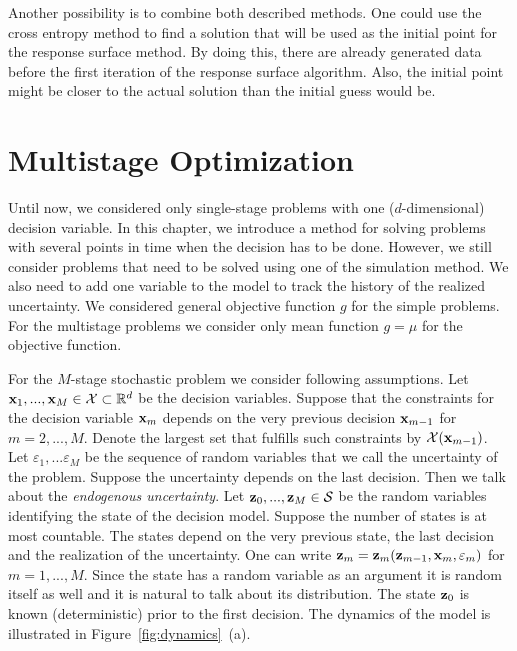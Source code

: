 Another possibility is to combine both described methods. One could use the cross entropy method to find a solution that will be used as the initial point for the response surface method. By doing this, there are already generated data before the first iteration of the response surface algorithm. Also, the initial point might be closer to the actual solution than the initial guess would be.



\section{Multistage Optimization}
	\label{chap:multistage}

Until now, we considered only single-stage problems with one ($d$-dimensional) decision variable. In this chapter, we introduce a method for solving problems with several points in time when the decision has to be done. However, we still consider problems that need to be solved using one of the simulation method. We also need to add one variable to the model to track the history of the realized uncertainty. We considered general objective function $g$ for the simple problems. For the multistage problems we consider only mean function $g = \mu$ for the objective function.

For the $M$-stage stochastic problem we consider following assumptions. Let $\mathbf{x}_1, ..., \mathbf{x}_{M} \in \mathcal{X} \subset \mathbb{R}^d$ be the decision variables. Suppose that the constraints for the decision variable $\mathbf{x}_m$ depends on the very previous decision $\mathbf{x}_{m-1}$ for $m = 2, ..., M$. Denote the largest set that fulfills such constraints by $\mathcal{X} (\mathbf{x}_{m-1})$. Let $\varepsilon_1, ... \varepsilon_M$ be the sequence of random variables that we call the uncertainty of the problem. Suppose the uncertainty depends on the last decision. Then we talk about the \emph{endogenous uncertainty}. Let $\operatorname{\mathbf{z}}_0, ..., \operatorname{\mathbf{z}}_M \in \mathcal{S}$ be the random variables identifying the state of the decision model. Suppose the number of states is at most countable. The states depend on the very previous state, the last decision and the realization of the uncertainty. One can write $\operatorname{\mathbf{z}}_m = \operatorname{\mathbf{z}}_m (\operatorname{\mathbf{z}}_{m-1}, \mathbf{x}_{m}, \varepsilon_m)$ for $m = 1, ..., M$. Since the state has a random variable as an argument it is random itself as well and it is natural to talk about its distribution. The state $\operatorname{\mathbf{z}}_0$ is known (deterministic) prior to the first decision. The dynamics of the model is illustrated in Figure~\ref{fig:dynamics}~(a).

